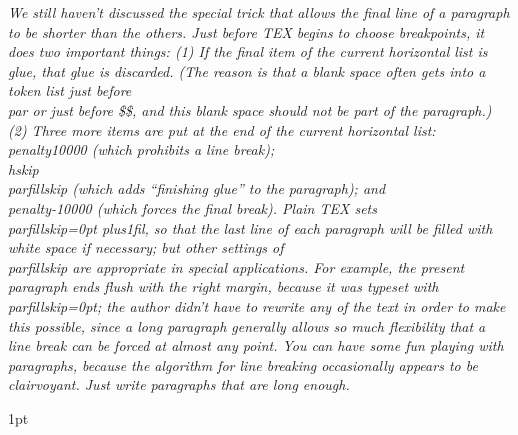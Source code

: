 \it
We still haven’t discussed the special trick that allows the final line of a
paragraph to be shorter than the others.
Just before TEX begins to choose
breakpoints, it does two important things: (1) If the final item of the current horizontal
list is glue, that glue is discarded. 
(The reason is that a blank space often gets into a
token list just before \\par or just before \$\$, 
and this blank space should not be part
of the paragraph.) 
(2) Three more items are put at the end of the current horizontal
list: \\{penalty10000} (which prohibits a line break); \\{hskip\\parfillskip} (which adds
“finishing glue” to the paragraph);
and \\penalty-10000 (which forces the final break).
Plain TEX sets \\parfillskip=0pt plus1fil,
so that the last line of each paragraph will
be filled with white space if necessary;
but other settings of \\parfillskip are appropriate in special applications.
For example, the present paragraph ends flush with the
right margin, because it was typeset with \\parfillskip=0pt; the author didn’t have to
rewrite any of the text in order to make this possible, since a long paragraph generally
allows so much flexibility that a line break can be forced at almost any point. You
can have some fun playing with paragraphs, because the algorithm for line breaking
occasionally appears to be clairvoyant. Just write paragraphs that are long enough.

1pt

